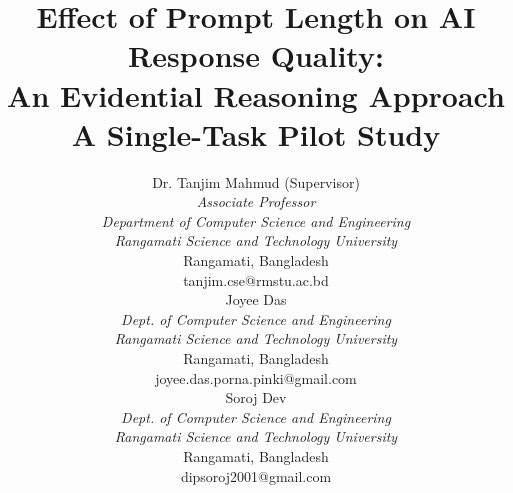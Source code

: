 \documentclass[conference]{IEEEtran}
\begin{document}
\title{Effect of Prompt Length on AI Response Quality: \\ An Evidential Reasoning Approach \\ \large A Single-Task Pilot Study}

\author{
\begin{minipage}[t]{0.30\textwidth}
\centering
\small
Dr. Tanjim Mahmud (Supervisor) \\
\textit{Associate Professor} \\
\textit{Department of Computer Science and Engineering} \\
\textit{Rangamati Science and Technology University} \\
Rangamati, Bangladesh \\
tanjim.cse@rmstu.ac.bd
\end{minipage}%
\hspace{0.04\textwidth}
\begin{minipage}[t]{0.30\textwidth}
\centering
\small
Joyee Das \\
\textit{Dept. of Computer Science and Engineering} \\
\textit{Rangamati Science and Technology University} \\
Rangamati, Bangladesh \\
joyee.das.porna.pinki@gmail.com
\end{minipage}%
\hspace{0.04\textwidth}
\begin{minipage}[t]{0.30\textwidth}
\centering
\small
Soroj Dev \\
\textit{Dept. of Computer Science and Engineering} \\
\textit{Rangamati Science and Technology University} \\
Rangamati, Bangladesh \\
dipsoroj2001@gmail.com
\end{minipage}
}

\maketitle
\end{document}
